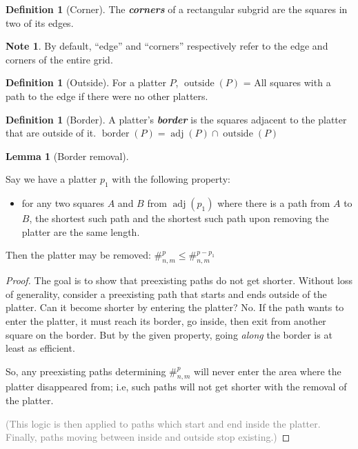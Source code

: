 \documentclass{article}
\theoremstyle{definition}%
\newtheorem{lemma}[theorem]{Lemma}
\newtheorem{definition}[theorem]{Definition}
\newtheorem*{note}{Note}
\newcommand{\minordetail}[1]{\textcolor{gray}{#1}}
\newcommand{\newterm}[1]{\textbf{\textit{#1}}}
\newcommand{\adj}{\operatorname{adj}}
\newcommand{\border}{\operatorname{border}}
\newcommand{\outside}{\operatorname{outside}}
\begin{document}
\begin{definition}[Corner]
The \newterm{corners} of a rectangular subgrid are the squares in two of its edges.
\end{definition}

\begin{note}
By default, ``edge'' and ``corners'' respectively refer to the edge and corners of the entire grid.
\end{note}

\begin{definition}[Outside]
For a platter $P$, $\outside(P)$ = All squares with a path to the edge if there were no other platters.
\end{definition}

\begin{definition}[Border]
A platter's \newterm{border} is the squares adjacent to the platter that are outside of it. $\border(P) = \adj(P) \cap \outside(P)$
\end{definition}

\begin{lemma}[Border removal]
\label{lem:Border removal}

Say we have a platter $p_1$ with the following property:

\begin{itemize}
\item for any two squares $A$ and $B$ from $\adj(p_1)$ where there is a path from $A$ to $B$, the shortest such path and the shortest such path upon removing the platter are the same length.
\end{itemize}

Then the platter may be removed: $\#^{p}_{n, m} \le \#^{p - p_1}_{n, m}$
\end{lemma}

\begin{proof}
The goal is to show that preexisting paths do not get shorter. Without loss of generality, consider a preexisting path that starts and ends outside of the platter. Can it become shorter by entering the platter? No. If the path wants to enter the platter, it must reach its border, go inside, then exit from another square on the border. But by the given property, going \emph{along} the border is at least as efficient.

So, any preexisting paths determining $\#^{p}_{n, m}$ will never enter the area where the platter disappeared from; i.e, such paths will not get shorter with the removal of the platter.

\minordetail{(This logic is then applied to paths which start and end inside the platter. Finally, paths moving between inside and outside stop existing.)}
\end{proof}
\end{document}
